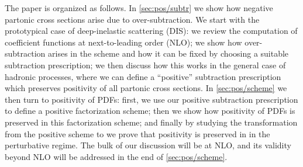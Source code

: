 The paper is organized as follows. In \cref{sec:pos/subtr} we show
how negative partonic cross sections arise due to over-subtraction. We
start with the   prototypical case of deep-inelastic scattering (DIS): we
review the computation of coefficient functions at next-to-leading
order (NLO); we show how over-subtraction arises in the \msbar{} scheme
and how it can be fixed by choosing a suitable subtraction
prescription; we then discuss how this works in the general case of
hadronic processes, where we can define a ``positive'' subtraction prescription
which preserves
positivity of all partonic cross sections.
In \cref{sec:pos/scheme} we then turn to
positivity of PDFs: first, we use our positive subtraction
prescription to define a positive factorization scheme; then we show
how positivity of PDFs is preserved in this factorization scheme; and
finally by studying the transformation from the positive scheme to  \msbar{}
we prove that positivity is preserved in \msbar{} in the perturbative
regime. The bulk of our discussion will be at NLO, and its validity
beyond NLO will be addressed in the end of \cref{sec:pos/scheme}.

